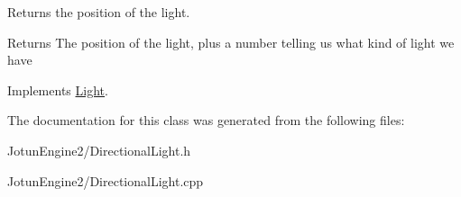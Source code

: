Returns the position of the light. 

\begin{DoxyReturn}{Returns}
The position of the light, plus a number telling us what kind of light we have 
\end{DoxyReturn}


Implements \hyperlink{class_light_a22cfe8279c9acfc1eb5ae6bbb00c3a2c}{Light}.



The documentation for this class was generated from the following files\-:\begin{DoxyCompactItemize}
\item 
Jotun\-Engine2/Directional\-Light.\-h\item 
Jotun\-Engine2/Directional\-Light.\-cpp\end{DoxyCompactItemize}
